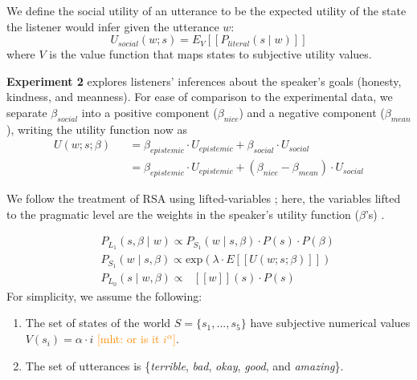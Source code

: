 \documentclass[10pt,letterpaper]{article}
\newcommand{\denote}[1]{\mbox{ $[\![ #1 ]\!]$}}
\newcommand{\mht}[1]{\textcolor{DarkOrange}{[mht: #1]}}
\newcommand{\ejy}[1]{\textcolor{Blue}{[ejy: #1]}}
\begin{document}
We define the social utility of an utterance to be the expected utility of the state the listener would infer given the utterance $w$: 
%
$$
U_{social}(w; s) = E_{V}[[P_{literal}(s \mid w)]]
$$
%
where $V$ is the value function that maps states to subjective utility values. 




\textbf{Experiment 2} explores listeners' inferences about the speaker's goals (honesty, kindness, and meanness).
For ease of comparison to the experimental data, we separate $\beta_{social}$ into a positive component ($\beta_{nice}$) and a negative component ($\beta_{mean}$), writing the utility function now as
\begin{eqnarray*}
U(w;s; \beta) && = \beta_{epistemic}\cdot U_{epistemic} + \beta_{social} \cdot U_{social} \\
&&= \beta_{epistemic}\cdot U_{epistemic} + (\beta_{nice} - \beta_{mean}) \cdot U_{social}
\end{eqnarray*}


%
%
We follow the treatment of RSA using lifted-variables \cite{GoodmanLassiter2015, Kao2014, Degen2015}; here, the variables lifted to the pragmatic level are the weights in the speaker's utility function ($\beta$'s) .

%
\begin{eqnarray}
&&P_{L_1}(s, \beta \mid w)\propto P_{S_1}(w \mid s, \beta)\cdot P(s) \cdot P(\beta) \label{eq:L1}\\
&&P_{S_1}(w \mid s, \beta) \propto \mathrm{exp}(\lambda \cdot E[[U(w; s; \beta)]])\label{eq:S1}\\
&&P_{L_0}(s \mid w, \beta)\propto \denote{w}(s) \cdot P(s) \label{eq:L0}
\end{eqnarray}
%
For simplicity, we assume the following:
\begin{enumerate}
\item The set of states of the world $S = \{s_{1}, ...,  s_{5}\}$ have subjective numerical values $V(s_{i}) = \alpha \cdot i$ \mht{or is it $i^\alpha$}. 
\item The set of utterances is \{\emph{terrible}, \emph{bad}, \emph{okay}, \emph{good}, and \emph{amazing}\}.
\end{enumerate}
\end{document}
